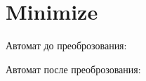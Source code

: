 \section{Minimize}
\begin{frame}{}
	Автомат до преоброзования:


	Автомат после преоброзования:

\end{frame}
